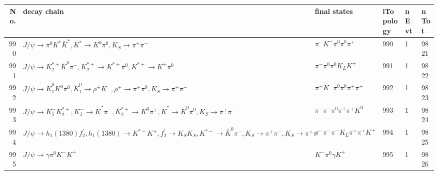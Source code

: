 \begin{table}[htbp] 
\begin{center}
\begin{small}
\begin{tabular}{rlllll}\hline\hline
 No. & decay chain & final states &  iTopology & nEvt & nTot \\\hline
990&$J/\psi       \rightarrow \pi^{0}        K^{*}          \bar{K}^{*}   , K^{*}           \rightarrow K^{0}          \pi^{0}        , K_{S}           \rightarrow \pi^{+}        \pi^{-}        $&$\pi^{-}        K^{-}          \pi^{0}        \pi^{0}        \pi^{+}        $&  990&    1& 9821\\
991&$J/\psi       \rightarrow K_2^{*+}       \bar{K}^{0}   \pi^{-}        , K_2^{*+}        \rightarrow K^{*+}         \pi^{0}        , K^{*+}          \rightarrow K^{+}          \pi^{0}        $&$\pi^{-}        \pi^{0}        \pi^{0}        K_{L}          K^{+}          $&  991&    1& 9822\\
992&$J/\psi       \rightarrow \bar{K}_1^{0} K^{0}          \pi^{0}        , \bar{K}_1^{0}  \rightarrow \rho^{+}      K^{-}          , \rho^{+}       \rightarrow \pi^{+}        \pi^{0}        , K_{S}           \rightarrow \pi^{+}        \pi^{-}        $&$\pi^{-}        K^{-}          \pi^{0}        \pi^{0}        \pi^{+}        \pi^{+}        $&  992&    1& 9823\\
993&$J/\psi       \rightarrow K_{1}^{-}      K_2^{*+}       , K_{1}^{-}       \rightarrow \bar{K}^{*}   \pi^{-}        , K_2^{*+}        \rightarrow K^{0}          \pi^{+}        , \bar{K}^{*}    \rightarrow \bar{K}^{0}   \pi^{0}        , K_{S}           \rightarrow \pi^{+}        \pi^{-}        $&$\pi^{-}        \pi^{-}        \pi^{0}        \pi^{+}        \pi^{+}        K^{0}          $&  993&    1& 9824\\
994&$J/\psi       \rightarrow h_{1}(1380)    f_2^{'}       , h_{1}(1380)     \rightarrow K^{*-}         K^{+}          , f_2^{'}        \rightarrow K_{S}          K_{S}          , K^{*-}          \rightarrow \bar{K}^{0}   \pi^{-}        , K_{S}           \rightarrow \pi^{+}        \pi^{-}        , K_{S}           \rightarrow \pi^{+}        \pi^{-}        $&$\pi^{-}        \pi^{-}        \pi^{-}        K_{L}          \pi^{+}        \pi^{+}        K^{+}          $&  994&    1& 9825\\
995&$J/\psi       \rightarrow \gamma       \pi^{0}        K^{-}          K^{+}          $&$K^{-}          \pi^{0}        \gamma       K^{+}          $&  995&    1& 9826\\

\end{tabular}
\end{small}
\end{center}
\end{table}
